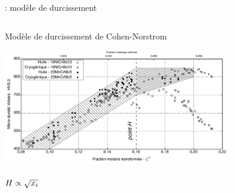\documentclass[aspectratio=169,pdf,t]{beamer}
\begin{document}
\begin{frame}{\insertsection}{\insertsubsection: modèle de durcissement}
  \begin{columns}[T]
    \begin{column}{0.7\textwidth}
      \centering{}
      Modèle de durcissement de Cohen-Norstrom~\cite{Cohen1968,Norstrom1976}
      \vspace{0.3cm}
      
      \includegraphics[width=10cm]{figures/hardness_norstrom}
      
      \vspace{0.3cm}
      $\Large{}H\propto{}\sqrt{x_{i}}$
    \end{column}
    \begin{column}{0.3\textwidth}
      \centering{}
      \vspace{0.6cm}
      
    \end{column}
  \end{columns}
\end{frame}
\end{document}
